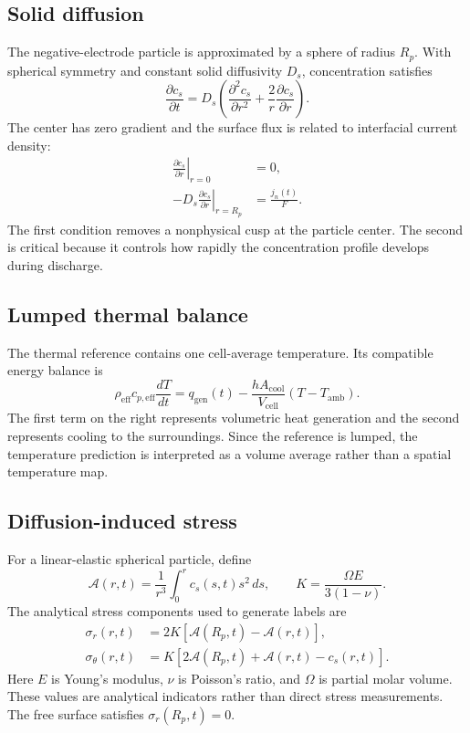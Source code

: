 \documentclass[14pt,a4paper,oneside]{extreport}
\begin{document}
\subsection{Solid diffusion}
The negative-electrode particle is approximated by a sphere of radius $R_p$. With spherical symmetry and constant solid diffusivity $D_s$, concentration satisfies
\begin{equation}
\frac{\partial c_s}{\partial t}=D_s\left(\frac{\partial^2c_s}{\partial r^2}+\frac{2}{r}\frac{\partial c_s}{\partial r}\right).
\label{eq:diffusion_report}
\end{equation}
The center has zero gradient and the surface flux is related to interfacial current density:
\begin{align}
\left.\frac{\partial c_s}{\partial r}\right|_{r=0}&=0,\\
-D_s\left.\frac{\partial c_s}{\partial r}\right|_{r=R_p}&=\frac{j_n(t)}{F}.
\end{align}
The first condition removes a nonphysical cusp at the particle center. The second is critical because it controls how rapidly the concentration profile develops during discharge.

\subsection{Lumped thermal balance}
The thermal reference contains one cell-average temperature. Its compatible energy balance is
\begin{equation}
\rho_{\mathrm{eff}}c_{p,\mathrm{eff}}\frac{dT}{dt}
=q_{\mathrm{gen}}(t)-\frac{hA_{\mathrm{cool}}}{V_{\mathrm{cell}}}(T-T_{\mathrm{amb}}).
\label{eq:thermal_report}
\end{equation}
The first term on the right represents volumetric heat generation and the second represents cooling to the surroundings. Since the reference is lumped, the temperature prediction is interpreted as a volume average rather than a spatial temperature map.

\subsection{Diffusion-induced stress}
For a linear-elastic spherical particle, define
\begin{equation}
\mathcal{A}(r,t)=\frac{1}{r^3}\int_0^r c_s(s,t)s^2\,ds,
\qquad K=\frac{\Omega E}{3(1-\nu)}.
\end{equation}
The analytical stress components used to generate labels are
\begin{align}
\sigma_r(r,t)&=2K\left[\mathcal{A}(R_p,t)-\mathcal{A}(r,t)\right],\\
\sigma_{\theta}(r,t)&=K\left[2\mathcal{A}(R_p,t)+\mathcal{A}(r,t)-c_s(r,t)\right].
\end{align}
Here $E$ is Young's modulus, $\nu$ is Poisson's ratio, and $\Omega$ is partial molar volume. These values are analytical indicators rather than direct stress measurements. The free surface satisfies $\sigma_r(R_p,t)=0$.
\end{document}
